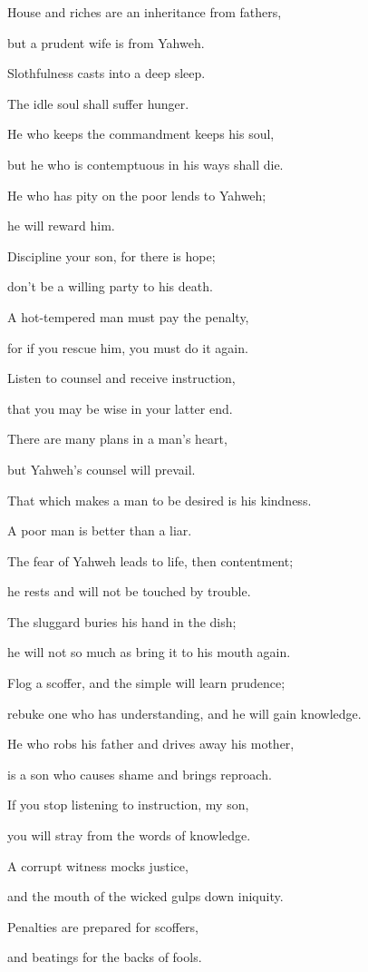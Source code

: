 {\par }{\Q {}House and riches are an inheritance from fathers,
\par }{\QB but a prudent wife is from Yahweh.
\par }{\Q {}Slothfulness casts into a deep sleep.
\par }{\QB The idle soul shall suffer hunger.
\par }{\Q {}He who keeps the commandment keeps his soul,
\par }{\QB but he who is contemptuous in his ways shall die.
\par }{\Q {}He who has pity on the poor lends to Yahweh;
\par }{\QB he will reward him.
\par }{\Q {}Discipline your son, for there is hope;
\par }{\QB don’t be a willing party to his death.
\par }{\Q {}A hot-tempered man must pay the penalty,
\par }{\QB for if you rescue him, you must do it again.
\par }{\Q {}Listen to counsel and receive instruction,
\par }{\QB that you may be wise in your latter end.
\par }{\Q {}There are many plans in a man’s heart,
\par }{\QB but Yahweh’s counsel will prevail.
\par }{\Q {}That which makes a man to be desired is his kindness.
\par }{\QB A poor man is better than a liar.
\par }{\Q {}The fear of Yahweh leads to life, then contentment;
\par }{\QB he rests and will not be touched by trouble.
\par }{\Q {}The sluggard buries his hand in the dish;
\par }{\QB he will not so much as bring it to his mouth again.
\par }{\Q {}Flog a scoffer, and the simple will learn prudence;
\par }{\QB rebuke one who has understanding, and he will gain knowledge.
\par }{\Q {}He who robs his father and drives away his mother,
\par }{\QB is a son who causes shame and brings reproach.
\par }{\Q {}If you stop listening to instruction, my son,
\par }{\QB you will stray from the words of knowledge.
\par }{\Q {}A corrupt witness mocks justice,
\par }{\QB and the mouth of the wicked gulps down iniquity.
\par }{\Q {}Penalties are prepared for scoffers,
\par }{\QB and beatings for the backs of fools.
\par }{\BB \par }
